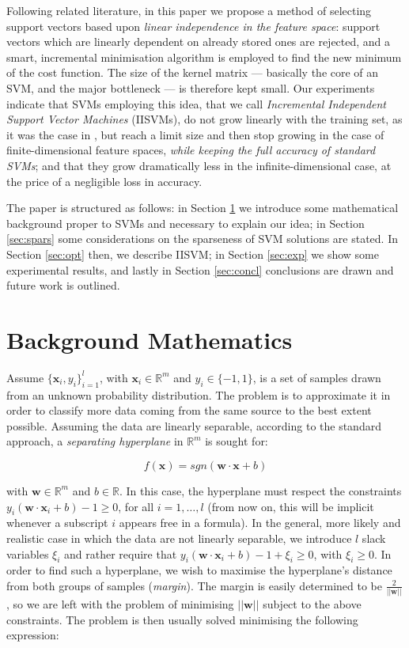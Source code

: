 \documentclass[10pt,twocolumn,letterpaper]{article}
\def\RR{\mathbb{R}}
\def\xx{\mathbf{x}}
\def\ww{\mathbf{w}}
\begin{document}
Following related literature, in this paper we propose a method of
selecting support vectors based upon \emph{linear independence in the
feature space}: support vectors which are linearly dependent on
already stored ones are rejected, and a smart, incremental
minimisation algorithm is employed to find the new minimum of the cost
function. The size of the kernel matrix --- basically the core of an
SVM, and the major bottleneck --- is therefore kept small. Our
experiments indicate that SVMs employing this idea, that we call
\emph{Incremental Independent Support Vector Machines} (IISVMs), do
not grow linearly with the training set, as it was the case in
\cite{Steinwart03}, but reach a limit size and then stop growing in
the case of finite-dimensional feature spaces, \emph{while keeping the
full accuracy of standard SVMs}; and that they grow dramatically less
in the infinite-dimensional case, at the price of a negligible loss in
accuracy.

The paper is structured as follows: in Section \ref{sec:bg} we
introduce some mathematical background proper to SVMs and necessary to
explain our idea; in Section \ref{sec:spars} some considerations on
the sparseness of SVM solutions are stated. In Section \ref{sec:opt}
then, we describe IISVM; in Section \ref{sec:exp} we show some
experimental results, and lastly in Section \ref{sec:concl}
conclusions are drawn and future work is outlined.

\section{Background Mathematics}
\label{sec:bg}

Assume $\{\xx_i,y_i\}_{i=1}^l$, with $\xx_i \in \RR^m$ and $y_i \in
\{-1,1\}$, is a set of samples drawn from an unknown probability
distribution. The problem is to approximate it in order to classify
more data coming from the same source to the best extent
possible. Assuming the data are linearly separable, according to the
standard approach, a \emph{separating hyperplane} in $\RR^m$ is sought
for:

\begin{equation} \label{eqn:dec}
  f(\xx) = sgn(\ww\cdot\xx + b)
\end{equation}

with $\ww \in \RR^m$ and $b \in \RR$. In this case, the hyperplane
must respect the constraints $y_i(\ww\cdot\xx_i + b)-1\geq 0$, for all
$i = 1,\ldots,l$ (from now on, this will be implicit whenever a
subscript $i$ appears free in a formula). In the general, more likely
and realistic case in which the data are not linearly separable, we
introduce $l$ slack variables $\xi_i$ and rather require that
$y_i(\ww\cdot\xx_i + b)-1+\xi_i\geq 0$, with $\xi_i \geq 0$. In order
to find such a hyperplane, we wish to maximise the hyperplane's
distance from both groups of samples (\emph{margin}). The margin is
easily determined to be $\frac{2}{||\ww||}$, so we are left with the
problem of minimising $||\ww||$ subject to the above constraints. The
problem is then usually solved minimising the following expression:
\end{document}
